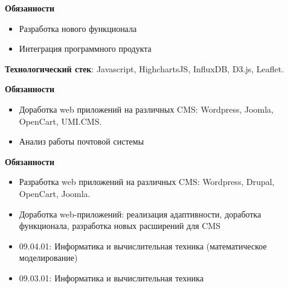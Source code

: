 \documentclass[10pt,a4paper,ragged2e,withhyper]{altacv}
\begin{document}
\begin{paracol}{2}
            \divider
            \textbf{Обязанности}
            \begin{itemize}
                \item Разработка нового функционала
                \item Интеграция программного продукта
            \end{itemize}
            \textbf{Технологический стек}: Javascript, HighchartsJS, InfluxDB, D3.js, Leaflet.


            \divider
            \textbf{Обязанности}
            \begin{itemize}
                \item Доработка web приложений на различных CMS: Wordpress, Joomla, OpenCart, UMI.CMS.
                \item Анализ работы почтовой системы
            \end{itemize}


            \divider
            \textbf{Обязанности}
            \begin{itemize}
                 \item Разработка web приложений на различных CMS: Wordpress, Drupal, OpenCart, Joomla.
                 \item Доработка web-приложений: реализация адаптивности, доработка функционала, разработка новых расширений для  CMS
            \end{itemize}

            \begin{itemize}
                \item 09.04.01: Информатика и вычислительная техника (математическое моделирование)
            \end{itemize}
            \divider

            \begin{itemize}
                \item 09.03.01: Информатика и вычислительная техника
            \end{itemize}
    \end{paracol}
\end{document}
